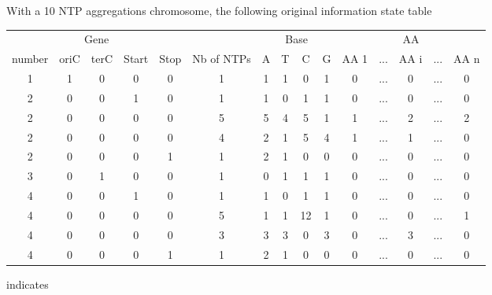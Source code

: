 \medskip

With a 10 NTP aggregations chromosome, the following original information state table
\begin{center}
\footnotesize
  \begin{tabular}{|ccccc|c|cccc|ccccc|}
    \hline
    \multicolumn{5}{|c|}{Gene} &  & \multicolumn{4}{|c|}{Base} & \multicolumn{5}{|c|}{AA} \\
    number & oriC & terC & Start & Stop & Nb of NTPs & A & T & C & G & AA 1 & ... & AA i & ... & AA n \\
    \hline
     1  &   1  &   0  &  0    &   0  & 1 &    1   &    1   &    0   &    1   &   0  & ... &  0   & ... &  0 \\
     2  &   0  &   0  &  1    &   0  & 1 &    1   &    0   &    1   &    1   &   0  & ... &  0   & ... &  0 \\
     2  &   0  &   0  &  0    &   0  & 5 &    5   &    4   &    5   &    1   &   1  & ... &  2   & ... &  2 \\
     2  &   0  &   0  &  0    &   0  & 4 &    2   &    1   &    5   &    4   &   1  & ... &  1   & ... &  0 \\
     2  &   0  &   0  &  0    &   1  & 1 &    2   &    1   &    0   &    0   &   0  & ... &  0   & ... &  0 \\
     3  &   0  &   1  &  0    &   0  & 1 &    0   &    1   &    1   &    1   &   0  & ... &  0   & ... &  0 \\
     4  &   0  &   0  &  1    &   0  & 1 &    1   &    0   &    1   &    1   &   0  & ... &  0   & ... &  0 \\
     4  &   0  &   0  &  0    &   0  & 5 &    1   &    1   &   12   &    1   &   0  & ... &  0   & ... &  1 \\
     4  &   0  &   0  &  0    &   0  & 3 &    3   &    3   &    0   &    3   &   0  & ... &  3   & ... &  0 \\
     4  &   0  &   0  &  0    &   1  & 1 &    2   &    1   &    0   &    0   &   0  & ... &  0   & ... &  0 \\
    \hline
  \end{tabular}
\end{center}
indicates
